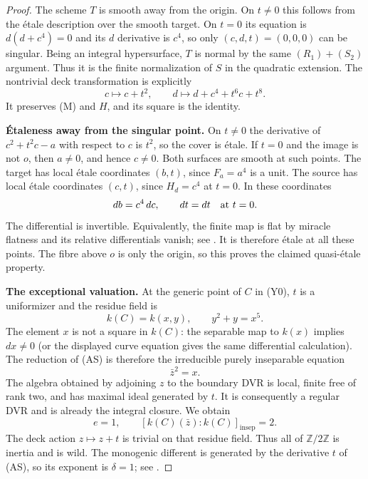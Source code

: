 \begin{proof}
The scheme $T$ is smooth away from the origin.  On $t\ne0$
this follows from the \'etale description over the smooth
target.  On $t=0$ its equation is $d(d+c^4)=0$ and its
$d$ derivative is $c^4$, so only $(c,d,t)=(0,0,0)$ can
be singular.  Being an integral hypersurface, $T$ is normal
by the same $(R_1)+(S_2)$ argument.  Thus it is the finite
normalization of $S$ in the quadratic extension.
The nontrivial deck transformation is explicitly
\[
       c\longmapsto c+t^2,
       \qquad d\longmapsto d+c^4+t^6c+t^8.
\]
It preserves (M) and $H$, and its square is the identity.

\par\smallskip\noindent\textbf{\'Etaleness away from the singular point.}\quad
On $t\ne0$ the derivative of $c^2+t^2c-a$ with respect to
$c$ is $t^2$, so the cover is \'etale.  If $t=0$ and the
image is not $o$, then $a\ne0$, and hence $c\ne0$.
Both surfaces are smooth at such points.  The target has
local \'etale coordinates $(b,t)$, since $F_a=a^4$ is a
unit.  The source has local \'etale coordinates $(c,t)$,
since $H_d=c^4$ at $t=0$.  In these coordinates
\[
                  db=c^4\,dc,
                         \qquad dt=dt
                    \quad\hbox{at }t=0.
\]
The differential is invertible.  Equivalently, the finite map
is flat by miracle flatness and its relative differentials
vanish; see \cite[Lemma 10.128.1, tag 00R4]{StacksBWildCurve}.
It is therefore \'etale at all these points.  The fibre above
$o$ is only the origin, so this proves the claimed
quasi-\'etale property.

\par\smallskip\noindent\textbf{The exceptional valuation.}\quad
At the generic point of $C$ in (Y0), $t$ is a uniformizer
and the residue field is
\[
                 k(C)=k(x,y),\qquad y^2+y=x^5.
\]
The element $x$ is not a square in $k(C)$: the separable map
to $k(x)$ implies $dx\ne0$ (or the displayed curve equation
gives the same differential calculation).  The reduction of
(AS) is therefore the irreducible purely inseparable equation
\[
                              \bar z^2=x.
\]
The algebra obtained by adjoining $z$ to the boundary DVR is
local, finite free of rank two, and has maximal ideal generated
by $t$.  It is consequently a regular DVR and is already the
integral closure.  We obtain
\[
                  e=1,
           \qquad [k(C)(\bar z):k(C)]_{\mathrm{insep}}=2.
\]
The deck action
$z\mapsto z+t$ is trivial on that residue field.  Thus all
of $\mathbb Z/2\mathbb Z$ is inertia and is wild.  The monogenic
different is generated by the derivative $t$ of (AS), so its
exponent is $\delta=1$; see
\cite[Example 49.12.5, tag 0BWB]{StacksBWildCurve}.


\end{proof}
